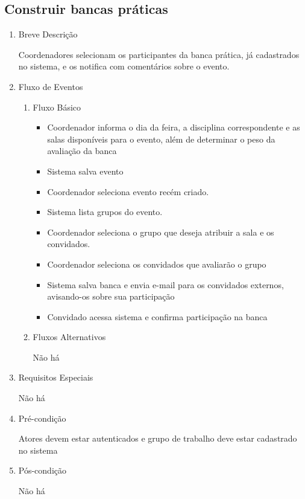 \subsection{Construir bancas práticas}


\begin{enumerate}
    \item Breve Descrição


Coordenadores selecionam os participantes da banca prática, já cadastrados no sistema, e os notifica com comentários sobre o evento.


    \item Fluxo de Eventos

\begin{enumerate}
    \item Fluxo Básico

\begin{itemize}
    \item Coordenador informa o dia da feira, a disciplina correspondente e as salas disponíveis para o evento, além de determinar o peso da avaliação da banca

    \item Sistema salva evento

    \item Coordenador seleciona evento recém criado.

    \item Sistema lista grupos do evento.

    \item Coordenador seleciona o grupo que deseja atribuir a sala e os convidados.

    \item Coordenador seleciona os convidados que avaliarão o grupo

    \item Sistema salva banca e envia e-mail para os convidados externos, avisando-os sobre sua participação

    \item Convidado acessa sistema e confirma participação na banca
\end{itemize}

    \item Fluxos Alternativos

Não há

\end{enumerate}
    \item Requisitos Especiais


Não há


    \item Pré-condição


Atores devem estar autenticados e grupo de trabalho deve estar cadastrado no sistema


    \item Pós-condição

    Não há
\end{enumerate}












